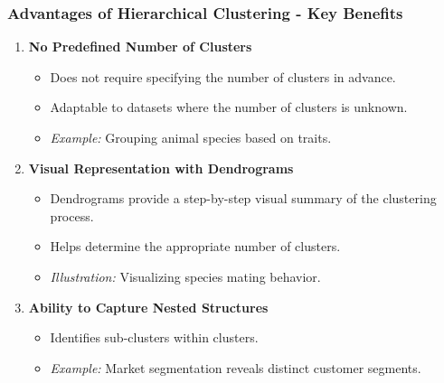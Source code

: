 \documentclass[aspectratio=169]{beamer}
\begin{document}
\begin{frame}[fragile]
    \frametitle{Advantages of Hierarchical Clustering - Key Benefits}
    \begin{enumerate}
        \item \textbf{No Predefined Number of Clusters} 
        \begin{itemize}
            \item Does not require specifying the number of clusters in advance.
            \item Adaptable to datasets where the number of clusters is unknown.
            \item \textit{Example:} Grouping animal species based on traits.
        \end{itemize}
        
        \item \textbf{Visual Representation with Dendrograms}
        \begin{itemize}
            \item Dendrograms provide a step-by-step visual summary of the clustering process.
            \item Helps determine the appropriate number of clusters.
            \item \textit{Illustration:} Visualizing species mating behavior.
        \end{itemize}
        
        \item \textbf{Ability to Capture Nested Structures}
        \begin{itemize}
            \item Identifies sub-clusters within clusters.
            \item \textit{Example:} Market segmentation reveals distinct customer segments.
        \end{itemize}
    \end{enumerate}
\end{frame}
\end{document}
